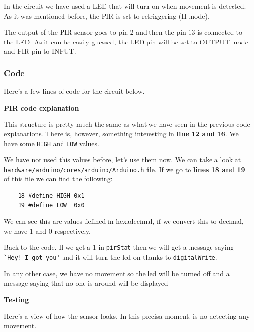 In the circuit we have used a LED that will turn on when movement is detected. As it was mentioned before, the PIR is set to retriggering (H mode).

The output of the PIR sensor goes to pin 2 and then the pin 13 is connected to the LED. As it can be easily guessed, the LED pin will be set to OUTPUT mode and PIR pin to INPUT.


\vspace{7mm}
\subsubsection{Code}
Here's a few lines of code for the circuit below.



\vspace{5mm}
\textbf{PIR code explanation}

This structure is pretty much the same as what we have seen in the previous code explanations. There is, however, something interesting in \textbf{line 12 and 16}. We have some \verb|HIGH| and \verb|LOW| values.

We have not used this values before, let's use them now. We can take a look at \verb|hardware/arduino/cores/arduino/Arduino.h| file. If we go to \textbf{lines 18 and 19} of this file we can find the following:
\begin{verbatim}
    18 #define HIGH 0x1
    19 #define LOW  0x0
\end{verbatim}
We can see this are values defined in hexadecimal, if we convert this to decimal, we have 1 and 0 respectively.

Back to the code. If we get a 1 in \verb|pirStat| then we will get a message saying \verb|`Hey! I got you'| and it will turn the led on thanks to \verb|digitalWrite|.

In any other case, we have no movement so the led will be turned off and a message saying that no one is around will be displayed.

\vspace{5mm}
\textbf{Testing}

Here's a view of how the sensor looks. In this precisa moment, is no detecting any movement.

